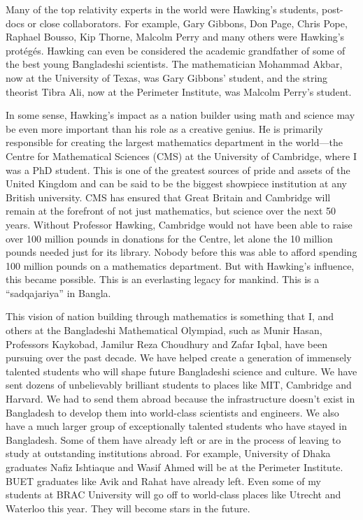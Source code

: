 \documentclass[a4paper,11pt]{article}
\begin{document}
Many of the top relativity experts in the world were Hawking's students, post-docs or close collaborators. For example, Gary Gibbons, Don Page, Chris Pope, Raphael Bousso, Kip Thorne, Malcolm Perry and many others were Hawking's protégés. Hawking can even be considered the academic grandfather of some of the best young Bangladeshi scientists. The mathematician Mohammad Akbar, now at the University of Texas, was Gary Gibbons' student, and the string theorist Tibra Ali, now at the Perimeter Institute, was Malcolm Perry's student.

In some sense, Hawking's impact as a nation builder using math and science may be even more important than his role as a creative genius. He is primarily responsible for creating the largest mathematics department in the world—the Centre for Mathematical Sciences (CMS) at the University of Cambridge, where I was a PhD student. This is one of the greatest sources of pride and assets of the United Kingdom and can be said to be the biggest showpiece institution at any British university. CMS has ensured that Great Britain and Cambridge will remain at the forefront of not just mathematics, but science over the next 50 years. Without Professor Hawking, Cambridge would not have been able to raise over 100 million pounds in donations for the Centre, let alone the 10 million pounds needed just for its library. Nobody before this was able to afford spending 100 million pounds on a mathematics department. But with Hawking's influence, this became possible. This is an everlasting legacy for mankind. This is a “sadqajariya” in Bangla.

This vision of nation building through mathematics is something that I, and others at the Bangladeshi Mathematical Olympiad, such as Munir Hasan, Professors Kaykobad, Jamilur Reza Choudhury and Zafar Iqbal, have been pursuing over the past decade. We have helped create a generation of immensely talented students who will shape future Bangladeshi science and culture. We have sent dozens of unbelievably brilliant students to places like MIT, Cambridge and Harvard. We had to send them abroad because the infrastructure doesn't exist in Bangladesh to develop them into world-class scientists and engineers. We also have a much larger group of exceptionally talented students who have stayed in Bangladesh. Some of them have already left or are in the process of leaving to study at outstanding institutions abroad. For example, University of Dhaka graduates Nafiz Ishtiaque and Wasif Ahmed will be at the Perimeter Institute. BUET graduates like Avik and Rahat have already left. Even some of my students at BRAC University will go off to world-class places like Utrecht and Waterloo this year. They will become stars in the future.
\end{document}
